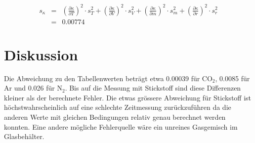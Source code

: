 \documentclass[12pt,a4paper]{article}
\begin{document}
\begin{eqnarray*}
s_\kappa & = & \left( \frac{\partial \kappa}{\partial T}\right) ^2\cdot s_T^2 + \left( \frac{\partial \kappa}{\partial V}\right) ^2\cdot s_V^2 + \left( \frac{\partial \kappa}{\partial m}\right) ^2\cdot s_m^2 + \left( \frac{\partial \kappa}{\partial r}\right) ^2\cdot s_r^2\\
& = & 0.00774
\end{eqnarray*}

\section*{Diskussion}
Die Abweichung zu den Tabellenwerten betr\"agt etwa 0.00039 f\"ur CO$_2$, 0.0085 f\"ur Ar und 0.026 f\"ur N$_2$. Bis auf die Messung mit Stickstoff sind diese Differenzen kleiner als der berechnete Fehler. Die etwas gr\"ossere Abwei\-chung f\"ur Stickstoff ist h\"ochstwahrscheinlich auf eine schlechte Zeitmessung zur\"uckzuf\"uhren da die anderen Werte mit gleichen Bedingungen relativ genau berechnet werden konnten. Eine andere m\"ogliche Fehlerquelle w\"are ein unreines Gasgemisch im Glasbeh\"alter.
\end{document}

